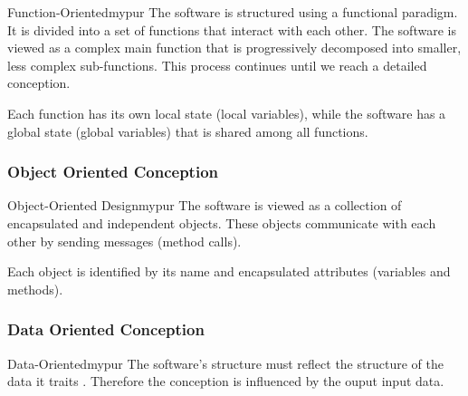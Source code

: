 \vspace{0.25cm}
\begin{prettyBox}{Function-Oriented}{mypur}
    The software is structured using a functional paradigm. It is divided into a set of functions 
that interact with each other. The software is viewed as a complex main function that is 
progressively decomposed into smaller, less complex sub-functions. This process continues until
we reach a detailed conception.

    \vspace{0.15cm}
    Each function has its own local state (local variables), while the software has
a global state (global variables) that is shared among all functions.
\end{prettyBox}

\vspace{0.5cm}
\subsubsection{Object Oriented Conception}

\vspace{0.25cm}

\begin{prettyBox}{Object-Oriented Design}{mypur}
    The software is viewed as a collection of encapsulated and independent objects. 
These objects communicate with each other by sending messages (method calls).

    \vspace{0.15cm}
    Each object is identified by its name and encapsulated attributes (variables and methods).
\end{prettyBox}


\vspace{0.5cm}

\subsubsection{Data Oriented Conception}

\vspace{0.25cm}

\begin{prettyBox}{Data-Oriented}{mypur}
    The software's structure must reflect the structure of the data it traits .
    Therefore the conception is influenced by the ouput input data.
\end{prettyBox}

\vspace{1cm}


